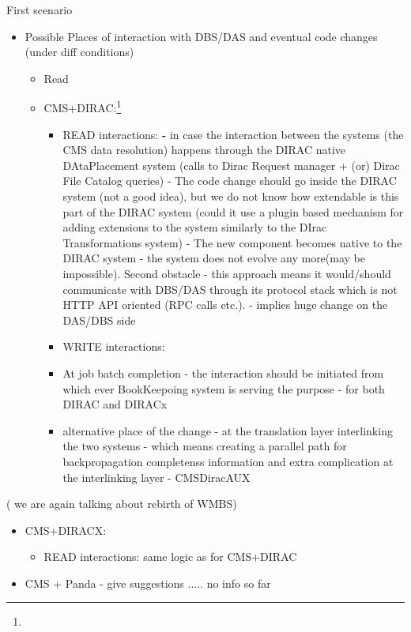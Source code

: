 \documentclass{beamer}
\begin{document}
\begin{frame}{First scenario}
\begin{itemize}
\item Possible Places of interaction with DBS/DAS and eventual code changes (under diff conditions)
\begin{itemize}
\item Read
\item CMS+DIRAC:\footnote{}
\begin{itemize}
\item READ interactions:
\textbf{-} in case the interaction between the systems (the CMS data resolution) happens through the DIRAC native DAtaPlacement system  (calls to Dirac Request manager + (or) Dirac File Catalog queries) - The code change should go inside the DIRAC system (not a good idea), but we do not know how extendable is this part of the DIRAC system (could it use a plugin based mechanism for adding extensions to the system similarly to the DIrac Transformations system) - The new component becomes native to the DIRAC system - the system does not evolve any more(may be impossible). Second obstacle - this approach means it would/should communicate with DBS/DAS  through its  protocol stack which is not HTTP API oriented (RPC calls etc.). - implies huge change on the DAS/DBS side
\item WRITE interactions:
\item At job batch completion - the interaction should be initiated from which ever BookKeepoing system is serving the purpose  - for both DIRAC and DIRACx
\item alternative place of the change - at the translation layer interlinking the two systems - which means creating a parallel path for backpropagation completenss information and extra complication at the interlinking layer - CMSDiracAUX
\end{itemize}
\end{itemize}
\end{itemize}
( we are again talking about rebirth of WMBS)

\begin{itemize}
\item CMS+DIRACX:
\begin{itemize}
\item READ interactions: same logic as for CMS+DIRAC
\end{itemize}
\item CMS + Panda - give suggestions ..... no info so far
\end{itemize}
\end{frame}
\end{document}
